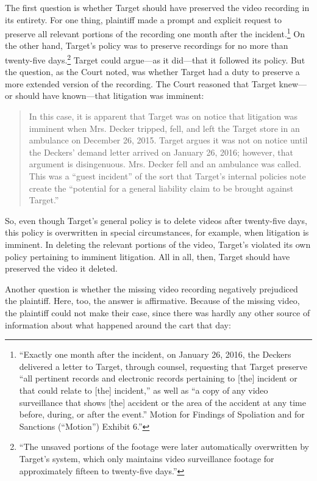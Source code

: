 \documentclass[
  10pt,
  dvipsnames,enabledeprecatedfontcommands]{scrartcl}
\begin{document}
The first question is whether Target should have preserved the video
recording in its entirety. For one thing, plaintiff made a prompt and
explicit request to preserve all relevant portions of the recording one
month after the incident.\footnote{``Exactly one month after the
  incident, on January 26, 2016, the Deckers delivered a letter to
  Target, through counsel, requesting that Target preserve ``all
  pertinent records and electronic records pertaining to {[}the{]}
  incident or that could relate to {[}the{]} incident,'' as well as ``a
  copy of any video surveillance that shows {[}the{]} accident or the
  area of the accident at any time before, during, or after the event.''
  Motion for Findings of Spoliation and for Sanctions (``Motion'')
  Exhibit 6.''} On the other hand, Target's policy was to preserve
recordings for no more than twenty-five days.\footnote{``The unsaved
  portions of the footage were later automatically overwritten by
  Target's system, which only maintains video surveillance footage for
  approximately fifteen to twenty-five days.''} Target could argue---as
it did---that it followed its policy. But the question, as the Court
noted, was whether Target had a duty to preserve a more extended version
of the recording. The Court reasoned that Target knew---or should have
known---that litigation was imminent:

\begin{quote}
 In this case, it is apparent that Target was on notice that litigation was
imminent when Mrs. Decker tripped, fell, and left the Target store in an ambulance on December 26, 2015. Target argues it was not on notice until the Deckers’ demand letter arrived on January 26, 2016; however, that argument is disingenuous. Mrs. Decker fell and an ambulance was called. This was a “guest incident” of the sort that Target’s internal policies note create the “potential for a general liability claim to be brought
against Target.” 
\end{quote}

\noindent  So, even though Target's general policy is to delete videos
after twenty-five days, this policy is overwritten in special
circumstances, for example, when litigation is imminent. In deleting the
relevant portions of the video, Target's violated its own policy
pertaining to imminent litigation. All in all, then, Target should have
preserved the video it deleted.

Another question is whether the missing video recording negatively
prejudiced the plaintiff. Here, too, the answer is affirmative. Because
of the missing video, the plaintiff could not make their case, since
there was hardly any other source of information about what happened
around the cart that day:
\end{document}
